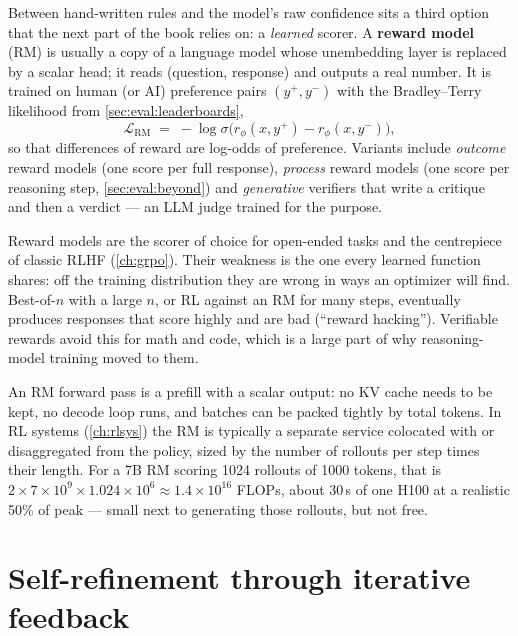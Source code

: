 Between hand-written rules and the model's raw confidence sits a third option that the next part of
the book relies on: a \emph{learned} scorer. A \textbf{reward model} (RM) is usually a copy of a
language model whose unembedding layer is replaced by a scalar head; it reads (question, response)
and outputs a real number. It is trained on human (or AI) preference pairs $(y^+, y^-)$ with the
Bradley--Terry likelihood from \cref{sec:eval:leaderboards},
\begin{equation}
  \mathcal{L}_{\text{RM}} \;=\; -\log \sigma\bigl(r_\phi(x, y^+) - r_\phi(x, y^-)\bigr),
\end{equation}
so that differences of reward are log-odds of preference. Variants include \emph{outcome} reward
models (one score per full response), \emph{process} reward models (one score per reasoning step,
\cref{sec:eval:beyond}) and \emph{generative} verifiers that write a critique and then a verdict ---
an LLM judge trained for the purpose.

Reward models are the scorer of choice for open-ended tasks and the centrepiece of classic RLHF
(\cref{ch:grpo}). Their weakness is the one every learned function shares: off the training
distribution they are wrong in ways an optimizer will find. Best-of-$n$ with a large $n$, or RL
against an RM for many steps, eventually produces responses that score highly and are bad
(``reward hacking''). Verifiable rewards avoid this for math and code, which is a large part of why
reasoning-model training moved to them.

\begin{systemslens}
An RM forward pass is a prefill with a scalar output: no KV cache needs to be kept, no decode loop
runs, and batches can be packed tightly by total tokens. In RL systems (\cref{ch:rlsys}) the RM is
typically a separate service colocated with or disaggregated from the policy, sized by the number of
rollouts per step times their length. For a 7B RM scoring 1024 rollouts of 1000 tokens, that is
$2 \times 7\times10^9 \times 1.024\times10^6 \approx 1.4\times10^{16}$ FLOPs, about 30\,s of one
H100 at a realistic 50\% of peak --- small next to generating those rollouts, but not free.
\end{systemslens}

\section{Self-refinement through iterative feedback}\label{sec:refine:selfrefine}

